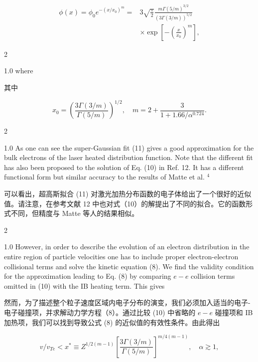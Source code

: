 \documentclass[oneside,onecolumn]{article}
\newcommand\enzhbox[2]{
  	\quad\par \begin{paracol}{2} \colseprulecolor{black} 
  			\begin{spacing}{1.0}
  				\footnotesize  #1
  			\end{spacing}
  		\switchcolumn[1] 
  		#2
  	\end{paracol} 
  }
\begin{document}
\begin{sloppypar}
{}
  
  \begin{dmath}[compact]
  \begin{aligned}
  \phi(x)=\phi_{0} e^{-\left(x / x_{0}\right)^{m}}= & 3 \sqrt{\frac{\pi}{2}} \frac{m \Gamma(5 / m)^{3 / 2}}{(3 \Gamma(3 / m))^{5 / 2}} \\
  & \times \exp \left[-\left(\frac{x}{x_{0}}\right)^{m}\right],
  \end{aligned}
  \end{dmath}
  
 
\enzhbox{   where
}{
其中

}
  
  \begin{dmath*}[compact]
  x_{0}=\left(\frac{3 \Gamma(3 / m)}{\Gamma(5 / m)}\right)^{1 / 2}, \quad m=2+\frac{3}{1+1.66 / \alpha^{0.724}} .
  \end{dmath*}
  
 
\enzhbox{   As one can see the super-Gaussian fit (11) gives a good approximation for the bulk electrons of the laser heated distribution function. Note that the different fit has also been proposed to the solution of Eq. (10) in Ref. 12. It has a different functional form but similar accuracy to the results of Matte et al. ${ }^{4}$
}{
可以看出，超高斯拟合 (11) 对激光加热分布函数的电子体给出了一个很好的近似值。请注意，在参考文献 12 中也对式（10）的解提出了不同的拟合。它的函数形式不同，但精度与 Matte 等人的结果相似。

}
  
 
\enzhbox{   However, in order to describe the evolution of an electron distribution in the entire region of particle velocities one has to include proper electron-electron collisional terms and solve the kinetic equation (8). We find the validity condition for the approximation leading to Eq. (8) by comparing $e-e$ collision terms omitted in (10) with the IB heating term. This gives
}{
然而，为了描述整个粒子速度区域内电子分布的演变，我们必须加入适当的电子-电子碰撞项，并求解动力学方程（8）。通过比较 (10) 中省略的 $e-e$ 碰撞项和 IB 加热项，我们可以找到导致公式 (8) 的近似值的有效性条件。由此得出

}
  
  \begin{dmath}[compact]
  v / v_{T e}<x^{*} \equiv Z^{1 / 2(m-1)}\left[\frac{3 \Gamma(3 / m)}{\Gamma(5 / m)}\right]^{m / 4(m-1)}, \quad \alpha \gtrsim 1,
  \end{dmath}
  

\end{sloppypar}
\end{document}
